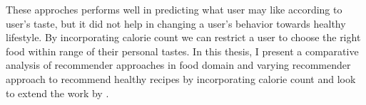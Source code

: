 These approches performs well in predicting what user may like according to user's taste, but it did not help in changing a user's behavior towards healthy lifestyle. By incorporating calorie count we can restrict a user to choose the right food within range of their personal tastes. In this thesis, I present a   comparative analysis of recommender approaches in food domain and varying recommender approach to recommend healthy recipes by incorporating calorie count and look to extend the work by \cite{16,18}.